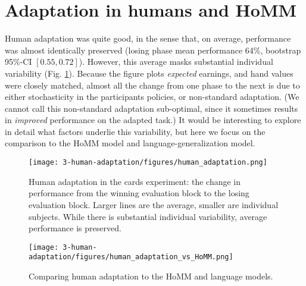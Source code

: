 \section{Adaptation in humans and HoMM}
Human adaptation was quite good, in the sense that, on average, performance was almost identically preserved (losing phase mean performance 64\%, bootstrap 95\%-CI \([0.55, 0.72]\)).  However, this average masks substantial individual variability (Fig. \ref{fig:human_cards_adaptation_results}). Because the figure plots \emph{expected} earnings, and hand values were closely matched, almost all the change from one phase to the next is due to either stochasticity in the participants policies, or non-standard adaptation. (We cannot call this non-standard adaptation sub-optimal, since it sometimes results in \emph{improved} performance on the adapted task.) It would be interesting to explore in detail what factors underlie this variability, but here we focus on the comparison to the HoMM model and language-generalization model. \par  
\begin{figure}
\centering
\texttt{[image: 3-human-adaptation/figures/human\_adaptation.png]}
\caption[Human adaptation in the cards experiment.]{Human adaptation in the cards experiment: the change in performance from the winning evaluation block to the losing evaluation block. Larger lines are the average, smaller are individual subjects. While there is substantial individual variability, average performance is preserved.} \label{fig:human_cards_adaptation_results}
\end{figure}

\begin{figure}
\centering
\texttt{[image: 3-human-adaptation/figures/human\_adaptation\_vs\_HoMM.png]}
\caption{Comparing human adaptation to the HoMM and language models.}\label{fig:human_cards_homm_results}
\end{figure}

